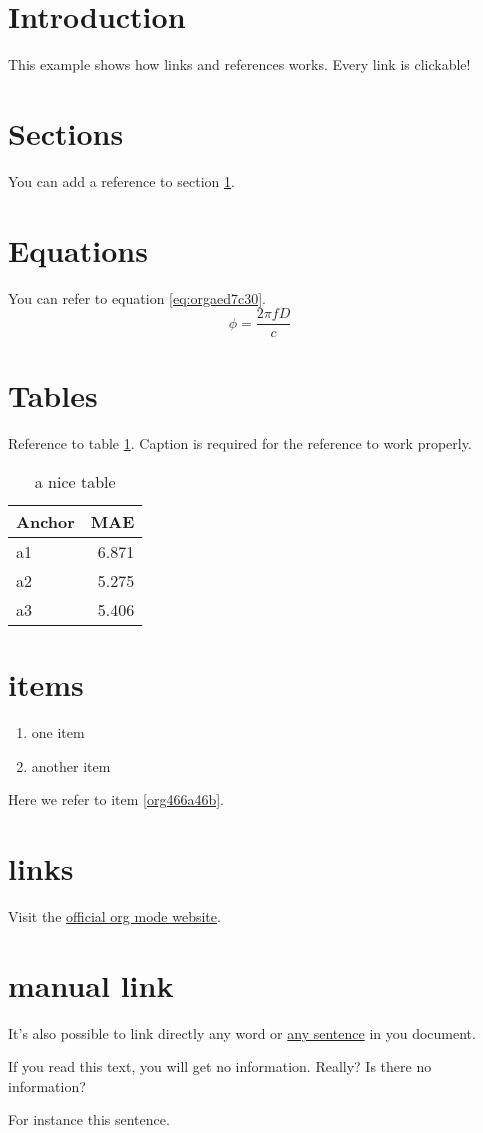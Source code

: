 


\section{Introduction}
\label{sec:org89668c3}
This example shows how links and references works.
Every link is clickable!

\section{Sections}
\label{sec:org4c5a8a8}
You can add a reference to section \ref{sec:org89668c3}.

\section{Equations}
\label{sec:org4633e8f}
You can refer to equation \ref{eq:orgaed7c30}.
\begin{equation}
\label{eq:orgaed7c30}
\phi = \frac{2\pi fD}{c}
\end{equation}

\section{Tables}
\label{sec:org00401ca}
Reference to table \ref{tab:org57ee04f}.
Caption is required for the reference to work properly.

\begin{table}[htbp]
\caption{\label{tab:org57ee04f}
a nice table}
\centering
\begin{tabular}{lr}
Anchor & MAE\\
\hline
a1 & 6.871\\
a2 & 5.275\\
a3 & 5.406\\
\end{tabular}
\end{table}

\section{items}
\label{sec:org46c12c3}
\begin{enumerate}
\item one item
\item \label{org466a46b}another item
\end{enumerate}
Here we refer to item \ref{org466a46b}.

\section{links}
\label{sec:org2a5b21f}
Visit the \href{https://orgmode.org/}{official org mode website}.

\section{manual link}
\label{sec:org447315c}
It's also possible to link directly any word
or \hyperlink{thesentence}{any sentence} in you document.

If you read this text, you will get no information.  Really?
Is there no information?

For instance \hypertarget{thesentence}{this sentence}.


